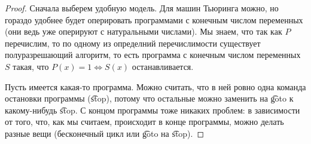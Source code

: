 \begin{proof}
	Сначала выберем удобную модель.
	Для машин Тьюринга можно, но гораздо удобнее будет оперировать программами с конечным числом переменных
	(они ведь уже оперируют с натуральными числами).
	Мы знаем, что так как $P$ перечислим, то по одному из определний перечислимости существует
	полуразрешающий алгоритм, то есть программа с конечным числом
	переменных $S$ такая, что $P(x) = 1 \iff S(x)$ останавливается.

	Пусть имеется какая-то программа.
	Можно считать, что в ней ровно одна команда остановки программы (\t{stop}), потому что остальные
	можно заменить на \t{goto} к какому-нибудь \t{stop}.
	С концом программы тоже никаких проблем: в зависимости от того, что, как мы считаем, происходит
	в конце программы, можно делать разные вещи (бесконечный цикл или \t{goto} на \t{stop}).


\end{proof}
